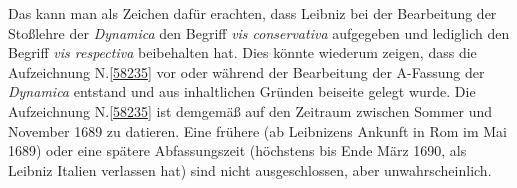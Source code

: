\begin{ledgroup}
Das kann man als Zeichen dafür erachten, dass %
Leibniz bei der Bearbeitung der Stoßlehre der \textit{Dynamica}\cite{01354} den Begriff \textit{vis conservativa} aufgegeben und lediglich den Begriff \textit{vis respectiva} beibehalten hat.
Dies könnte wiederum zeigen, dass die Aufzeichnung N.\;\ref{58235} vor oder während der Bearbeitung der A-Fassung der \textit{Dynamica}\cite{01354} entstand und aus inhaltlichen Gründen beiseite gelegt wurde.%
\pend%
\pstart%
Die Aufzeichnung N.\;\ref{58235} ist demgemäß auf den Zeitraum zwischen Sommer und November 1689 zu datieren.
Eine frühere (ab Leibnizens Ankunft in Rom im Mai 1689) oder eine spätere Abfassungszeit (höchstens bis Ende März 1690, als Leibniz Italien verlassen hat) sind nicht ausgeschlossen, aber unwahrscheinlich.%
\pend%
\end{ledgroup}
\normalsize%
%
\frenchspacing%
